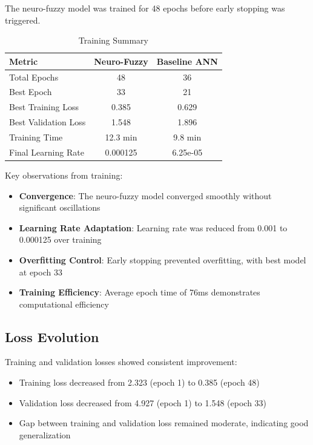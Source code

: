 \documentclass[12pt,a4paper]{report}
\begin{document}
The neuro-fuzzy model was trained for 48 epochs before early stopping was triggered.

\begin{table}[ht]
\centering
\caption{Training Summary}
\label{tab:training_summary}
\begin{tabular}{lcc}
\toprule
\textbf{Metric} & \textbf{Neuro-Fuzzy} & \textbf{Baseline ANN} \\
\midrule
Total Epochs & 48 & 36 \\
Best Epoch & 33 & 21 \\
Best Training Loss & 0.385 & 0.629 \\
Best Validation Loss & 1.548 & 1.896 \\
Training Time & 12.3 min & 9.8 min \\
Final Learning Rate & 0.000125 & 6.25e-05 \\
\bottomrule
\end{tabular}
\end{table}

Key observations from training:

\begin{itemize}
    \item \textbf{Convergence}: The neuro-fuzzy model converged smoothly without significant oscillations
    \item \textbf{Learning Rate Adaptation}: Learning rate was reduced from 0.001 to 0.000125 over training
    \item \textbf{Overfitting Control}: Early stopping prevented overfitting, with best model at epoch 33
    \item \textbf{Training Efficiency}: Average epoch time of 76ms demonstrates computational efficiency
\end{itemize}

\subsection{Loss Evolution}

Training and validation losses showed consistent improvement:

\begin{itemize}
    \item Training loss decreased from 2.323 (epoch 1) to 0.385 (epoch 48)
    \item Validation loss decreased from 4.927 (epoch 1) to 1.548 (epoch 33)
    \item Gap between training and validation loss remained moderate, indicating good generalization
\end{itemize}
\end{document}
